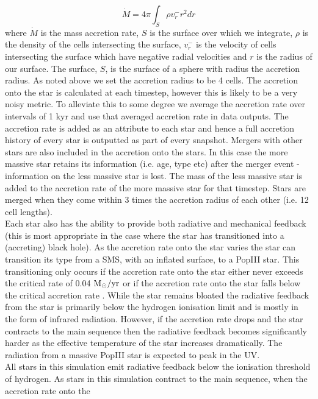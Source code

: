 \documentclass[graphics, twocolumn, usenatbib]{mn2e}
\newcommand{\msolaryr} {$\rm{M_{\odot}/yr}~$}
\begin{document}
\begin{equation}
  \dot{M} = 4\pi \int_S {\rho v_r^- r^2 dr}
\end{equation}
where $\dot{M}$ is the mass accretion rate, $S$ is the surface over which we integrate, $\rho$ is the
density of the cells intersecting the surface, $v_r^-$ is the velocity of cells intersecting
the surface which have negative radial velocities and $r$ is the radius of our surface.
The surface, $S$, is the surface of a sphere with radius the accretion radius. As noted above we
set the accretion radius to be 4 cells. The accretion onto the star is calculated at each timestep,
however this is likely to be a very noisy metric. To alleviate this to some degree we average
the accretion rate over intervals of 1 kyr and use that averaged accretion rate in data outputs. The accretion rate is added as an attribute to each star and hence a full
accretion history of every star is outputted as part of every snapshot. Mergers with other stars
are also included in the accretion onto the stars. In this case the more massive star retains its
information (i.e. age, type etc) after the merger event - information on the less massive star is
lost. The mass of the less massive star is added to the accretion rate of the more massive star for
that timestep. Stars are merged when they come within 3 times the accretion radius of each other (i.e. 12 cell lengths).\\
\indent Each star also has the ability to provide both radiative and mechanical feedback (this is
most appropriate in the case where the star has transitioned into a (accreting) black hole). As the
accretion rate onto the star varies the star can transition its type from a SMS, with an inflated
surface, to a PopIII star. This transitioning only occurs if the accretion rate onto the star either
never exceeds the critical rate of 0.04 \msolaryr or if the accretion rate onto the star falls below
the critical accretion rate \citep{Sakurai_2016}. While the star remains bloated the radiative
feedback from the star is primarily below the hydrogen ionisation limit and is mostly in the
form of infrared radiation. However, if the accretion rate drops and the star contracts to the
main sequence then the radiative feedback becomes significantly harder as the effective
temperature of the star increases dramatically. The radiation from a massive PopIII star is expected
to peak in the UV. \\
\indent All stars in this simulation emit radiative feedback below the ionisation threshold of
hydrogen. As stars in this simulation contract to the main sequence, when the accretion rate onto the
\end{document}
